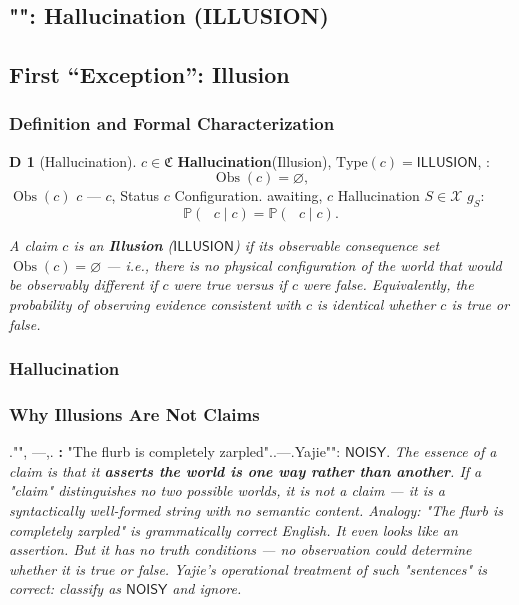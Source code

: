 \documentclass[12pt,a4paper]{article}
\theoremstyle{plain}
\theoremstyle{definition}
\newtheorem{definition}[theorem]Definition
\theoremstyle{remark}
\newcommand{\Pbb}{\mathbb{P}}
\newcommand{\X}{\mathcal{X}}
\newcommand{\ClaimSpace}{\mathfrak{C}}
\newcommand{\Null}{\varnothing}
\DeclareMathOperator{\ObsSet}{Obs}
\newcommand{\NOISY}{\mathsf{NOISY}}
\begin{document}
\subsection{"": Hallucination (ILLUSION)}
\subsection{First ``Exception'': Illusion}
\subsubsection{}
\subsubsection{Definition and Formal Characterization}
\begin{definition}[Hallucination]\label{def:illusion}
 $c \in \ClaimSpace$ \textbf{Hallucination}(Illusion), $\mathrm{Type}(c) = \mathsf{ILLUSION}$, : 
\begin{equation}
 \ObsSet(c) = \Null,
\end{equation}
 $\ObsSet(c)$ $c$ --- $c$, Status $c$ Configuration.
awaiting, $c$ Hallucination $S \in \X$ $g_S$: 
\begin{equation}
 \Pbb(\text{ $c$} \mid c\text{}) = \Pbb(\text{ $c$} \mid c\text{}).
\end{equation}
\end{definition}
\vspace{4pt}
\noindent
\textit{A claim $c$ is an \textbf{Illusion} ($\mathsf{ILLUSION}$) if its observable consequence set $\ObsSet(c) = \Null$ --- i.e., there is no physical configuration of the world that would be observably different if $c$ were true versus if $c$ were false. Equivalently, the probability of observing evidence consistent with $c$ is identical whether $c$ is true or false.}
\subsubsection{Hallucination}
\subsubsection{Why Illusions Are Not Claims}
."", ---,.
\textbf{: } "The flurb is completely zarpled"..---.Yajie"": $\NOISY$.
\vspace{4pt}
\noindent
\textit{The essence of a claim is that it \textbf{asserts the world is one way rather than another}. If a "claim" distinguishes no two possible worlds, it is not a claim --- it is a syntactically well-formed string with no semantic content. Analogy: "The flurb is completely zarpled" is grammatically correct English. It even looks like an assertion. But it has no truth conditions --- no observation could determine whether it is true or false. Yajie's operational treatment of such "sentences" is correct: classify as $\NOISY$ and ignore.}
\end{document}
